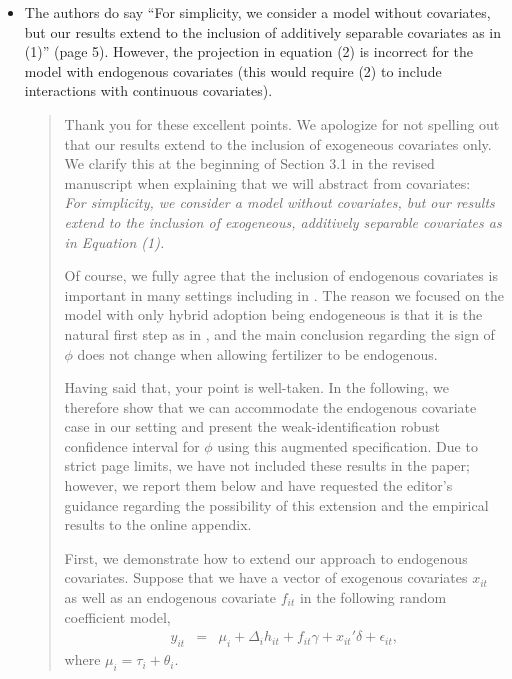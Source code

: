 \documentclass{article}[11pt]
\begin{document}
\begin{enumerate}
\begin{itemize}
      \begin{quote}
          Thank you for this excellent point. Since this comment closely relates to the next one, we reply to both together in the following response.
      \end{quote}

      \item[(b)] The authors do say ``For simplicity, we consider a model without covariates, but our results extend to the inclusion of additively separable covariates as in (1)'' (page 5). However, the projection in equation (2) is incorrect for the model with endogenous covariates (this would require (2) to include interactions with continuous covariates).
      \begin{quote}
      Thank you for these excellent points. We apologize for not spelling out that our results extend to the inclusion of exogeneous covariates only. We clarify this at the beginning of Section 3.1 in the revised manuscript when explaining that we will abstract from covariates:\\
      \emph{For simplicity, we consider a model without covariates, but our results extend to the inclusion of exogeneous, additively separable covariates as in Equation (1).}\newline
      
      Of course, we fully agree that the inclusion of endogenous covariates is important in many settings including in \citet{S2011}. The reason we focused on the model with only hybrid adoption being endogeneous is that it is the natural first step as in \citet{S2011}, and the main conclusion regarding the sign of $\phi$ does not change when allowing fertilizer to be endogenous.\newline 
      
      Having said that, your point is well-taken. 
      In the following, we therefore show that we can accommodate the endogenous covariate case in our setting and present the weak-identification robust confidence interval for $\phi$ using this augmented specification.
      Due to strict page limits, we have not included these results in the paper; however, we report them below and have requested the editor's guidance regarding the possibility of this extension and the empirical results to the online appendix.\newline

      First, we demonstrate how to extend our approach to endogenous covariates. 
      Suppose that we have a vector of exogenous covariates $x_{it}$ as well as an endogenous covariate $f_{it}$ in the following random coefficient model,
      \begin{eqnarray}
      y_{it}&=&\mu_i+\Delta_i h_{it}+f_{it}\gamma+x_{it}'\delta+\epsilon_{it}, 
      \end{eqnarray}
where $\mu_i=\tau_i+\theta_i$. \newline


\end{quote}
\end{itemize}
\end{enumerate}
\end{document}
